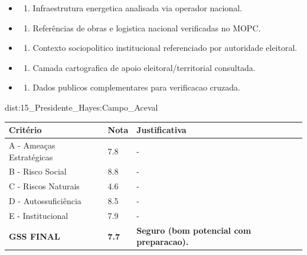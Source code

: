 {\begin{itemize}
\item
  \begin{enumerate}
  \def\labelenumi{\arabic{enumi})}
  \setcounter{enumi}{7}
  \tightlist
  \item
    Infraestrutura energetica analisada via operador nacional.
  \end{enumerate}
\item
  \begin{enumerate}
  \def\labelenumi{\arabic{enumi})}
  \setcounter{enumi}{8}
  \tightlist
  \item
    Referências de obras e logistica nacional verificadas no MOPC.
  \end{enumerate}
\item
  \begin{enumerate}
  \def\labelenumi{\arabic{enumi})}
  \setcounter{enumi}{9}
  \tightlist
  \item
    Contexto sociopolitico institucional referenciado por autoridade
    eleitoral.
  \end{enumerate}
\item
  \begin{enumerate}
  \def\labelenumi{\arabic{enumi})}
  \setcounter{enumi}{10}
  \tightlist
  \item
    Camada cartografica de apoio eleitoral/\allowbreak territorial consultada.
  \end{enumerate}
\item
  \begin{enumerate}
  \def\labelenumi{\arabic{enumi})}
  \setcounter{enumi}{11}
  \tightlist
  \item
    Dados publicos complementares para verificacao cruzada.
  \end{enumerate}
\end{itemize}}{dist:15_Presidente_Hayes:Campo_Aceval}
\begin{table}[ht!]
\small \begin{tabular}{p{3.0cm}p{0.8cm}p{6.0cm}} \toprule
\textbf{Critério} & \textbf{Nota} & \textbf{Justificativa} \\ \midrule
A - Ameaças Estratégicas & 7.8 & - \\
B - Risco Social & 8.8 & - \\
C - Riscos Naturais & 4.6 & - \\
D - Autossuficiência & 8.5 & - \\
E - Institucional & 7.9 & - \\
\midrule \textbf{GSS FINAL} & \textbf{7.7} & \textbf{Seguro (bom potencial com preparacao).} \\ \bottomrule \end{tabular}
\end{table}
